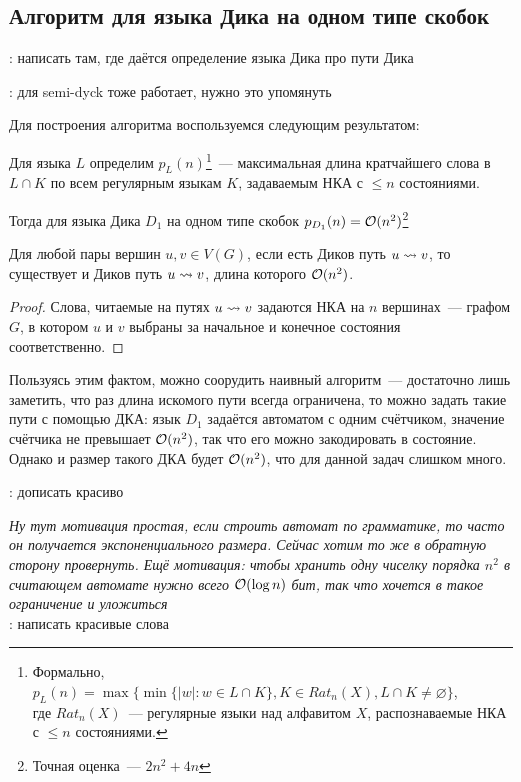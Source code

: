 \subsection{Алгоритм для языка Дика на одном типе скобок}

\TODO: написать там, где даётся определение языка Дика про пути Дика

\TODO: для semi-dyck тоже работает, нужно это упомянуть

Для построения алгоритма воспользуемся следующим результатом:

\begin{lemma}

Для языка $L$ определим $p_L(n)$\footnote{Формально, $p_L(n) = \max \{ \min \{|w| \colon w \in L \cap K \}, K \in Rat_n(X), L \cap K \ne \varnothing \}$,\\ где $Rat_n(X)$~--- регулярные языки над алфавитом $X$, распознаваемые НКА с $\le n$ состояниями.}~--- максимальная длина кратчайшего слова в $L \cap K$ по всем регулярным языкам $K$, задаваемым НКА с $\le n$ состояниями.

Тогда для языка Дика $D_1$ на одном типе скобок $p_{D_1}(n) = \mathcal{O}(n^2)$\footnote{Точная оценка~--- $2n^2 + 4n$}
\end{lemma}

\begin{corollary}
    Для любой пары вершин $u, v \in V(G)$, если есть Диков путь $u \rightsquigarrow v$, то существует и Диков путь $u \rightsquigarrow v$, длина которого $\mathcal{O}(n^2)$.
\end{corollary}
\begin{proof}
    Слова, читаемые на путях $u \rightsquigarrow v$ задаются НКА на $n$ вершинах~--- графом $G$, в котором $u$ и $v$ выбраны за начальное и конечное состояния соответственно.
\end{proof}

\begin{note}
Пользуясь этим фактом, можно соорудить наивный алгоритм~--- достаточно лишь заметить, что раз длина искомого пути всегда ограничена, то можно задать такие пути с помощью ДКА: язык $D_1$ задаётся автоматом с одним счётчиком, значение счётчика не превышает $\mathcal{O}(n^2)$, так что его можно закодировать в состояние. Однако и размер такого ДКА будет $\mathcal{O}(n^2)$, что для данной задач слишком много.
\end{note} 

\TODO: дописать красиво

\textit{Ну тут мотивация простая, если строить автомат по грамматике, то часто он получается экспоненциального размера. Сейчас хотим то же в обратную сторону провернуть. Ещё мотивация: чтобы хранить одну чиселку порядка $n^2$ в считающем автомате нужно всего $\mathcal{O}(\log n)$ бит, так что хочется в такое ограничение и уложиться}\\
\TODO: написать красивые слова

